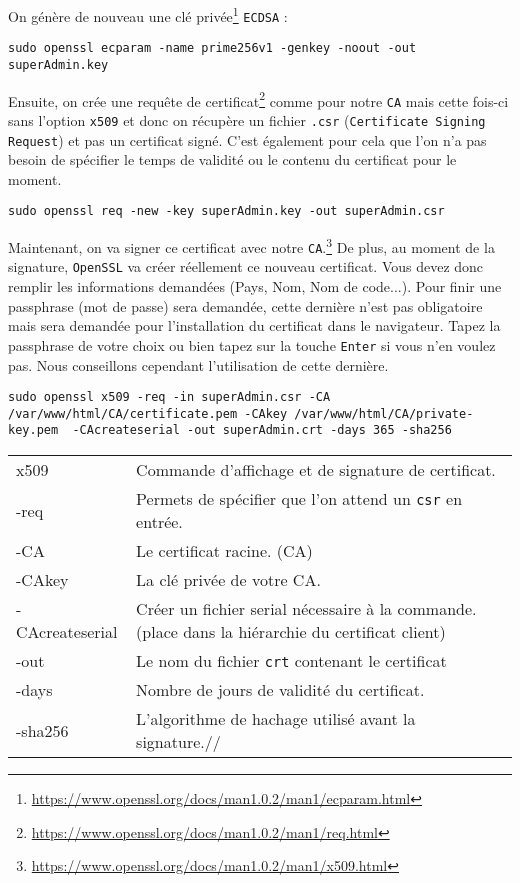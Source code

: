 On génère de nouveau une clé privée\footnote{\url{https://www.openssl.org/docs/man1.0.2/man1/ecparam.html}} \texttt{ECDSA} :
\begin{verbatim}
sudo openssl ecparam -name prime256v1 -genkey -noout -out superAdmin.key
\end{verbatim}

Ensuite, on crée une requête de certificat\footnote{\url{https://www.openssl.org/docs/man1.0.2/man1/req.html}} comme pour notre \texttt{CA} mais cette fois-ci sans l'option \texttt{x509} et donc on récupère un fichier \texttt{.csr} (\texttt{Certificate Signing Request}) et pas un certificat signé. C'est également pour cela que l'on n'a pas besoin de spécifier le temps de validité ou le contenu du certificat pour le moment.
\begin{verbatim}
sudo openssl req -new -key superAdmin.key -out superAdmin.csr
\end{verbatim}

Maintenant, on va signer ce certificat avec notre \texttt{CA}.\footnote{\url{https://www.openssl.org/docs/man1.0.2/man1/x509.html}} De plus, au moment de la signature, \texttt{OpenSSL} va créer réellement ce nouveau certificat. Vous devez donc remplir les informations demandées (Pays, Nom, Nom de code...). Pour finir une passphrase (mot de passe) sera demandée, cette dernière n'est pas obligatoire mais sera demandée pour l'installation du certificat dans le navigateur. Tapez la passphrase de votre choix ou bien tapez sur la touche \texttt{Enter} si vous n'en voulez pas. Nous conseillons cependant l'utilisation de cette dernière.
\begin{verbatim}
sudo openssl x509 -req -in superAdmin.csr -CA /var/www/html/CA/certificate.pem -CAkey /var/www/html/CA/private-key.pem  -CAcreateserial -out superAdmin.crt -days 365 -sha256
\end{verbatim}

\begin{tabular}{l|p{10cm}}
    x509 & Commande d'affichage et de signature de certificat. \\
    -req & Permets de spécifier que l'on attend un \texttt{csr} en entrée.\\
    -CA & Le certificat racine. (CA)\\
    -CAkey & La clé privée de votre CA.\\
    -CAcreateserial & Créer un fichier serial nécessaire à la commande. (place dans la hiérarchie du certificat client)\\
    -out & Le nom du fichier \texttt{crt} contenant le certificat\\
    -days & Nombre de jours de validité du certificat.\\
    -sha256 & L'algorithme de hachage utilisé avant la signature.//
\end{tabular}

